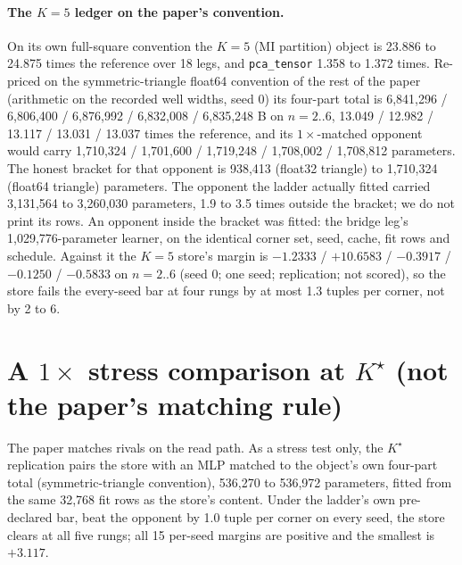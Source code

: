 \documentclass{article} %
\newcommand{\Kstar}{\ensuremath{K^{\star}}}
\begin{document}
\paragraph{The $K=5$ ledger on the paper's convention.} On its own full-square convention the
$K=5$ (MI partition) object is 23.886 to 24.875 times the reference over 18 legs, and
\texttt{pca\_tensor} 1.358 to 1.372 times. %
Re-priced on the symmetric-triangle float64 convention of the rest of the paper (arithmetic on the
recorded well widths, seed 0) its four-part total is 6,841,296 / 6,806,400 / 6,876,992 / 6,832,008
/ 6,835,248 B on $n=2..6$, 13.049 / 12.982 / 13.117 / 13.031 / 13.037 times the reference, and its
$1\times$-matched opponent would carry 1,710,324 / 1,701,600 / 1,719,248 / 1,708,002 / 1,708,812
parameters. %
The honest bracket for that opponent is 938,413 (float32 triangle) to 1,710,324 (float64
triangle) parameters. The opponent the ladder actually fitted carried 3,131,564 to 3,260,030
parameters, 1.9 to 3.5 times outside the bracket; we do not print its rows.
An opponent inside the bracket was fitted: the bridge leg's 1,029,776-parameter learner, on the
identical corner set, seed, cache, fit rows and schedule. Against it the $K=5$ store's margin is
$-1.2333$ / $+10.6583$ / $-0.3917$ / $-0.1250$ / $-0.5833$ on $n=2..6$ (seed 0; one seed;
replication; not scored), so the store fails the every-seed bar at four rungs by at most 1.3 tuples
per corner, not by 2 to 6. %

\section{A $1\times$ stress comparison at $\Kstar$ (not the paper's matching rule)}
\label{app:1x}

The paper matches rivals on the read path. As a stress test only, the $\Kstar$ replication pairs the
store with an MLP matched to the object's own four-part total (symmetric-triangle convention),
536,270 to 536,972 parameters, fitted from the same 32,768 fit rows as the store's content.
Under the ladder's own pre-declared bar, beat the opponent by 1.0 tuple per corner on every seed,
the store clears at all five rungs; all 15 per-seed margins are positive and the smallest is
$+3.117$. %
\end{document}
